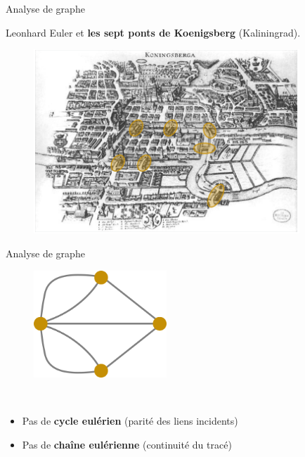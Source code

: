 \begin{frame}{Analyse de graphe}

Leonhard Euler et \textbf{les sept ponts de Koenigsberg} (Kaliningrad).


\begin{figure}
  \includegraphics[width=10cm]{Konigsberg.png}
\end{figure}

\end{frame}


\begin{frame}{Analyse de graphe}

\begin{figure}
  \includegraphics[width=5cm]{Konigsberg_graph.png}
\end{figure}

~

\begin{itemize}
\item Pas de \textbf{cycle eulérien} (parité des liens incidents)
\item Pas de \textbf{chaîne eulérienne} (continuité du tracé)
\end{itemize}


\end{frame}




